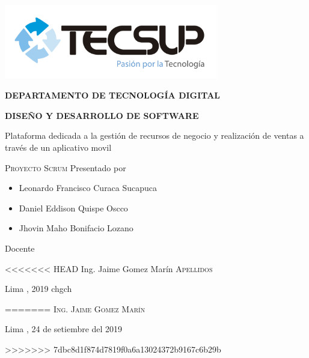 \begin{titlepage}
	\centering
	\includegraphics[width=0.70\textwidth]{img/logo_tecsup_final}\par\vspace{1cm}
	\vspace{0.30cm}	
	{\scshape\large\bfseries DEPARTAMENTO DE TECNOLOG\'IA DIGITAL \par}
	\vspace{0.60cm}	
	{\scshape\large\bfseries DISEÑO Y DESARROLLO DE SOFTWARE  \par}
	\vspace{2.00cm}		
	{\large\large Plataforma dedicada a la gestión de recursos de negocio y realización de ventas a través de un aplicativo movil \par}
	\vspace{0.60cm}
	{\scshape\large Proyecto Scrum }
	\vspace{0.60cm}
	\vfill
	Presentado por \par
	{\large\itshape { 
		\begin{itemize}
			\item Leonardo Francisco Curaca Sucapuca
			\item Daniel Eddison Quispe Oscco
			\item Jhovin Maho Bonifacio Lozano
		\end{itemize} 
	}\par}
	\vspace{0.30cm}
	\vfill
	Docente \par
<<<<<<< HEAD
	Ing. Jaime Gomez Marín  \textsc{ Apellidos}
	
  \vspace{0.30cm}
	\vfill
        {\large Lima , 2019 chgch \par}
=======
	\textsc{Ing. Jaime Gomez Marín}
	
  \vspace{0.30cm}
	\vfill
        {\large Lima , 24 de setiembre del 2019 \par}
>>>>>>> 7dbc8d1f874d7819f0a6a13024372b9167c6b29b
\end{titlepage}

